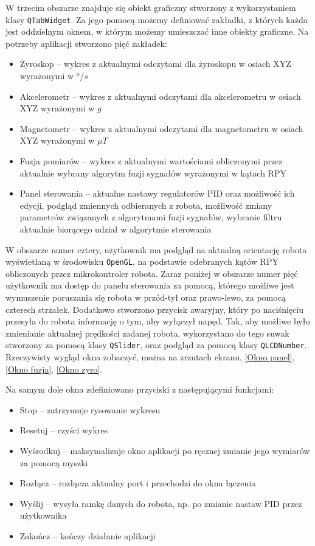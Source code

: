 W trzecim obszarze znajduje się obiekt graficzny stworzony z wykorzystaniem klasy \texttt{QTabWidget}. Za jego pomocą możemy definiować zakładki, z których każda jest oddzielnym oknem, w którym możemy umieszczać inne obiekty graficzne. Na potrzeby aplikacji stworzono pięć zakładek:
\begin{itemize}
    \item Żyroskop -- wykres z aktualnymi odczytami dla żyroskopu w osiach XYZ wyrażonymi w $^o/s$
    \item Akcelerometr -- wykres z aktualnymi odczytami dla akcelerometru w osiach XYZ wyrażonymi w $g$
    \item Magnetometr -- wykres z aktualnymi odczytami dla magnetometru w osiach XYZ wyrażonymi w $\mu T$
    \item Fuzja pomiarów -- wykres z aktualnymi wartościami obliczonymi przez aktualnie wybrany algorytm fuzji sygnałów wyrażonymi w kątach RPY
    \item Panel sterowania -- aktualne nastawy regulatorów PID oraz możliwość ich edycji, podgląd zmiennych odbieranych z robota, możliwość zmiany parametrów związanych z algorytmami fuzji sygnałów, wybranie filtru aktualnie biorącego udział w algorytmie sterowania
\end{itemize}

W obszarze numer cztery, użytkownik ma podgląd na aktualną orientację robota wyświetlaną w środowisku \texttt{OpenGL}, na podstawie odebranych kątów RPY obliczonych przez mikrokontroler robota. Zaraz poniżej w obszarze numer pięć użytkownik ma dostęp do panelu sterowania za pomocą, którego możliwe jest wymuszenie poruszania się robota w przód-tył oraz prawo-lewo, za pomocą czterech strzałek. Dodatkowo stworzono przycisk awaryjny, który po naciśnięciu przesyła do robota informację o tym, aby wyłączył napęd. Tak, aby możliwe było zmienianie aktualnej prędkości zadanej robota, wykorzystano do tego suwak stworzony za pomocą klasy \texttt{QSlider}, oraz podgląd za pomocą klasy \texttt{QLCDNumber}. Rzeczywisty wygląd okna zobaczyć, można na zrzutach ekranu, \ref{Okno panel}, \ref{Okno fuzja}, \ref{Okno zyro}.

Na samym dole okna zdefiniowano przyciski z następującymi funkcjami:
\begin{itemize}
    \item Stop -- zatrzymuje rysowanie wykresu
    \item Resetuj -- czyści wykres
    \item Wyśrodkuj -- maksymalizuje okno aplikacji po ręcznej zmianie jego wymiarów za pomocą myszki
    \item Rozłącz -- rozłącza aktualny port i przechodzi do okna łączenia
    \item Wyślij -- wysyła ramkę danych do robota, np. po zmianie nastaw PID przez użytkownika
    \item Zakończ -- kończy działanie aplikacji
\end{itemize}

